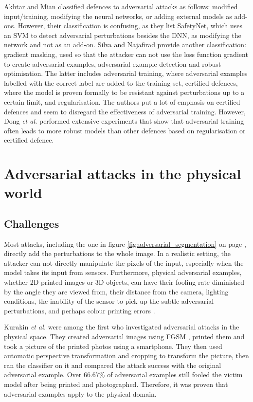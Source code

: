 Akhtar and Mian \cite{akhtar} classified defences to adversarial attacks as follows: modified input/training, modifying the neural networks, or adding external models as add-ons. However, their classification is confusing, as they list SafetyNet, which uses an SVM to detect adversarial perturbations besides the DNN, as modifying the network and not as an add-on. Silva and Najafirad \cite{silva_survey} provide another classification: gradient masking, used so that the attacker can not use the loss function gradient to create adversarial examples, adversarial example detection and robust optimisation. The latter includes adversarial training, where adversarial examples labelled with the correct label are added to the training set, certified defences, where the model is proven formally to be resistant against perturbations up to a certain limit, and regularisation. The authors put a lot of emphasis on certified defences and seem to disregard the effectiveness of adversarial training. However, Dong \textit{et al.} \cite{dong2020benchmarking} performed extensive experiments that show that adversarial training often leads to more robust models than other defences based on regularisation or certified defence.

\section{Adversarial attacks in the physical world}
\subsection{Challenges}

Most attacks, including the one in figure \ref{fig:adversarial_segmentation} on page \pageref{fig:adversarial_segmentation}, directly add the perturbations to the whole image. In a realistic setting, the attacker can not directly manipulate the pixels of the input, especially when the model takes its input from sensors. Furthermore, physical adversarial examples, whether 2D printed images or 3D objects, can have their fooling rate diminished by the angle they are viewed from, their distance from the camera, lighting conditions, the inability of the sensor to pick up the subtle adversarial perturbations, and perhaps colour printing errors \cite{kurakin2016adversarial, athalye, evtimov_road_signs}.

Kurakin \textit{et al.} \cite{kurakin2016adversarial} were among the first who investigated adversarial attacks in the physical space. They created adversarial images using FGSM \cite{fgsm}, printed them and took a picture of the printed photos using a smartphone. They then used automatic perspective transformation and cropping to transform the picture, then ran the classifier on it and compared the attack success with the original adversarial example. Over 66.67\% of adversarial examples still fooled the victim model after being printed and photographed. Therefore, it was proven that adversarial examples apply to the physical domain.

